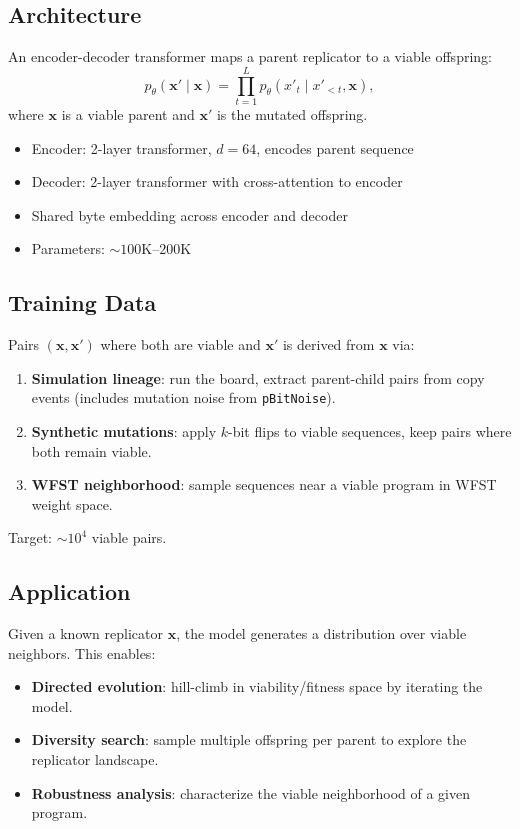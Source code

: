 \documentclass{article}
\begin{document}
\subsection{Architecture}

An encoder-decoder transformer maps a parent replicator to a viable
offspring:
\begin{equation}
  p_\theta(\mathbf{x}' \mid \mathbf{x}) = \prod_{t=1}^{L}
    p_\theta(x'_t \mid x'_{<t}, \mathbf{x}),
\end{equation}
where $\mathbf{x}$ is a viable parent and $\mathbf{x}'$ is the mutated
offspring.

\begin{itemize}
  \item Encoder: 2-layer transformer, $d=64$, encodes parent sequence
  \item Decoder: 2-layer transformer with cross-attention to encoder
  \item Shared byte embedding across encoder and decoder
  \item Parameters: ${\sim}100$K--$200$K
\end{itemize}

\subsection{Training Data}

Pairs $(\mathbf{x}, \mathbf{x}')$ where both are viable and $\mathbf{x}'$
is derived from $\mathbf{x}$ via:
\begin{enumerate}
  \item \textbf{Simulation lineage}: run the board, extract parent-child
        pairs from copy events (includes mutation noise from \texttt{pBitNoise}).
  \item \textbf{Synthetic mutations}: apply $k$-bit flips to viable
        sequences, keep pairs where both remain viable.
  \item \textbf{WFST neighborhood}: sample sequences near a viable program
        in WFST weight space.
\end{enumerate}
Target: ${\sim}10^4$ viable pairs.

\subsection{Application}

Given a known replicator $\mathbf{x}$, the model generates a distribution
over viable neighbors.  This enables:
\begin{itemize}
  \item \textbf{Directed evolution}: hill-climb in viability/fitness space
        by iterating the model.
  \item \textbf{Diversity search}: sample multiple offspring per parent to
        explore the replicator landscape.
  \item \textbf{Robustness analysis}: characterize the viable neighborhood
        of a given program.
\end{itemize}
\end{document}
